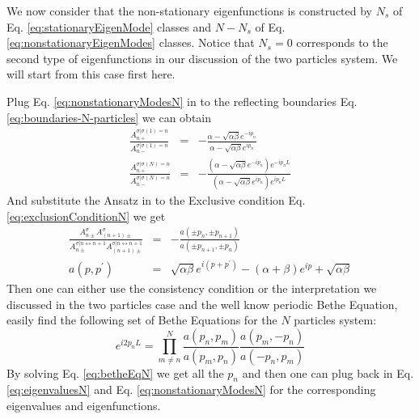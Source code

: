 We now consider that the non-stationary eigenfunctions is constructed by $N_s$ of
Eq. \eqref{eq:stationaryEigenMode} classes and $N-N_s$ of Eq.
\eqref{eq:nonstationaryEigenModes} classes. Notice that $N_s=0$ corresponds to
the second type of eigenfunctions in our discussion of the two particles system.
We will start from this case first here.

Plug Eq. \eqref{eq:nonstationaryModesN} in to the reflecting boundaries Eq.
\eqref{eq:boundaries-N-particles} we can obtain 
\begin{subequations}
    \label{eq:scatterFactorBoundaryN}
    \begin{align}
        \frac{A_{n+}^{\sigma|\sigma(1)=n}}{A_{n-}^{\sigma|\sigma(1)=n}} & = &
        -\frac{\alpha-\sqrt{\alpha\beta}
            e^{-ip_{n}}}{\alpha-\sqrt{\alpha\beta} e^{ip_{n}}}
        \\ \frac{A_{n+}^{\sigma|\sigma(N)=n}}{A_{n-}^{\sigma|\sigma(N)=n}} & = &
        -\frac{\left(\alpha-\sqrt{\alpha\beta} e^{-ip_{n}}\right)
            e^{-ip_{n}L}}{\left(\alpha-\sqrt{\alpha\beta}
                e^{ip_{n}}\right) e^{ip_{n}L}}
    \end{align}
\end{subequations}
And substitute the Ansatz in to the Exclusive condition Eq.
\eqref{eq:exclusionConditionN} we get
\begin{subequations}
    \label{eq:scatterFactorExclusiveN}
    \begin{align}
        \frac{A_{n\pm}^{\sigma}A_{(n+1)\pm}^{\sigma}}{A_{n\pm}^{\sigma|
                n\leftrightarrow n+1}A_{(n+1)\pm}^{\sigma|n\leftrightarrow n+1}}
        & = & -\frac{a(\pm p_{n},\pm p_{n+1})}{a(\pm p_{n+1}, \pm p_{n})} \\
        a(p, p^{\prime}) & = & \sqrt{\alpha\beta}e^{i(p+p^{\prime})} - (\alpha +
        \beta) e^{i p} + \sqrt{\alpha\beta}
    \end{align}
\end{subequations}
Then one can either use the consistency condition or the interpretation we
discussed in the two particles case and the well know periodic Bethe Equation,
easily find the following set of Bethe Equations for the $N$ particles system:
\begin{equation}
    \label{eq:betheEqN}
    e^{i2p_nL}  =  \prod_{m\neq n}^N\frac{a(p_n, p_m)}{a(p_m, p_n)} 
    \frac{a(p_m, -p_n)}{a(-p_n, p_m)}
\end{equation}
By solving Eq. \eqref{eq:betheEqN} we get all the $p_n$ and then one can plug
back in Eq. \eqref{eq:eigenvaluesN} and Eq. \eqref{eq:nonstationaryModesN} for
the corresponding eigenvalues and eigenfunctions. 

